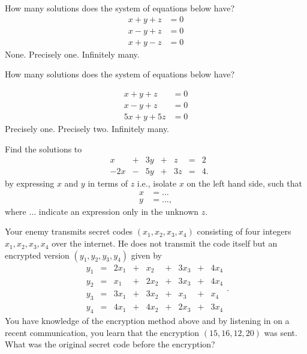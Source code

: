 \documentclass{article}
\begin{document}
\begin{quizexercise}[showhide]
 \begin{quiz}
\question
How many solutions does the system of equations below have?
\begin{align*}
x + y + z &= 0\\
x - y + z &= 0\\
x + y - z &= 0
\end{align*}
None.
Precisely one.
Infinitely many.
\end{quiz}
\end{quizexercise}


\begin{quizexercise}[showhide]
How many solutions does the system of equations below have?
  \begin{quiz}
\question

\begin{align*}
x + y + z &= 0\\
x - y + z &= 0\\
5 x + y +5z &= 0
\end{align*}
Precisely one.
Precisely two.
Infinitely many.
\end{quiz}
\end{quizexercise}

\beginshex
Find the solutions to
$$
\begin{matrix}
& x &+ &3 y &+ &z &= &2\\
&-2 x &- &5 y &+ &3 z &= &4.
\end{matrix}
$$
by expressing $x$ and $y$ in terms of $z$ i.e., isolate $x$ on the
left hand side, such that
\begin{align*}
  x &= \dots\\
  y &= \dots,
\end{align*}
where $\dots$ indicate an expression only in the unknown $z$.
\endshex


\beginshex
Your enemy transmits secret codes $(x_1, x_2, x_3, x_4)$ consisting of four integers $x_1, x_2, x_3, x_4$ over the internet. He does
not transmit the code itself but an encrypted version $(y_1, y_2, y_3, y_4)$ given by
\begin{equation*}
\begin{matrix}
  y_1 &= &2 x_1 &+ &x_2 &+ &3 x_3 &+  &4 x_4\\
  y_2 &= &x_1 &+ &2 x_2 &+ &3 x_3 &+  &4 x_4\\
  y_3 &= &3 x_1 &+ &3 x_2 &+ &x_3 &+  &x_4\\
  y_4 &= &4 x_1 &+ &4 x_2 &+ &2 x_3 &+  &3 x_4
\end{matrix}.
\end{equation*}
You have knowledge of the encryption method above and by listening in on
a recent communication, you learn that the encryption
$(15, 16, 12, 20)$ was sent. What was the original secret code before the encryption?
\end{document}
